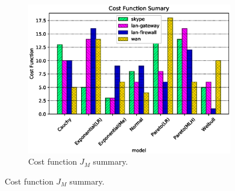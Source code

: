 \begin{figure}[ht!]
\begin{figure}[H]
\end{figure}
\begin{figure}[H]
\centering
\includegraphics[scale=0.5]{figures/apC/rm/cost-function-summary.eps}
\caption{Cost function $J_M$ summary.}
\label{fig:cost-function-summary}
\end{figure}
\end{figure}

\clearpage
